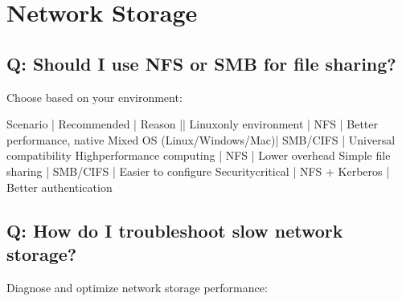 \documentclass[letterpaper,10pt,english]{sphinxmanual}
\begin{document}
\section{Network Storage}
\label{\detokenize{faq:network-storage}}

\subsection{Q: Should I use NFS or SMB for file sharing?}
\label{\detokenize{faq:q-should-i-use-nfs-or-smb-for-file-sharing}}
\sphinxAtStartPar
{} Choose based on your environment:

\begin{sphinxVerbatim}[commandchars=\\\{\}]
Scenario                    | Recommended | Reason
\PYGZhy{}\PYGZhy{}\PYGZhy{}\PYGZhy{}\PYGZhy{}\PYGZhy{}\PYGZhy{}\PYGZhy{}\PYGZhy{}\PYGZhy{}\PYGZhy{}\PYGZhy{}\PYGZhy{}\PYGZhy{}\PYGZhy{}\PYGZhy{}\PYGZhy{}\PYGZhy{}\PYGZhy{}\PYGZhy{}\PYGZhy{}\PYGZhy{}\PYGZhy{}\PYGZhy{}\PYGZhy{}\PYGZhy{}\PYGZhy{}\PYGZhy{}|\PYGZhy{}\PYGZhy{}\PYGZhy{}\PYGZhy{}\PYGZhy{}\PYGZhy{}\PYGZhy{}\PYGZhy{}\PYGZhy{}\PYGZhy{}\PYGZhy{}\PYGZhy{}\PYGZhy{}|\PYGZhy{}\PYGZhy{}\PYGZhy{}\PYGZhy{}\PYGZhy{}\PYGZhy{}\PYGZhy{}\PYGZhy{}\PYGZhy{}\PYGZhy{}\PYGZhy{}\PYGZhy{}\PYGZhy{}\PYGZhy{}\PYGZhy{}\PYGZhy{}\PYGZhy{}\PYGZhy{}
Linux\PYGZhy{}only environment     | NFS         | Better performance, native
Mixed OS (Linux/Windows/Mac)| SMB/CIFS    | Universal compatibility
High\PYGZhy{}performance computing  | NFS         | Lower overhead
Simple file sharing         | SMB/CIFS    | Easier to configure
Security\PYGZhy{}critical          | NFS + Kerberos | Better authentication
\end{sphinxVerbatim}


\subsection{Q: How do I troubleshoot slow network storage?}
\label{\detokenize{faq:q-how-do-i-troubleshoot-slow-network-storage}}
\sphinxAtStartPar
{} Diagnose and optimize network storage performance:
\end{document}
